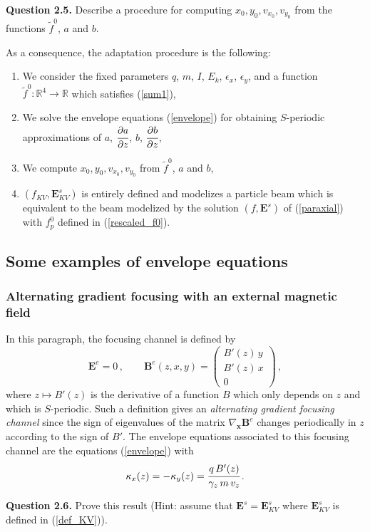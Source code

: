 \documentclass[10pt]{article}
\newcommand{\R}{{\mathbb R}}
\newcommand{\D}{{\partial}}
\begin{document}
\begin{leftbar}
\textbf{Question 2.5.} Describe a procedure for computing $x_{0},y_{0},v_{x_{0}},v_{y_{0}}$ from the functions $\tilde{f}^{0}$, $a$ and $b$.
\end{leftbar}


As a consequence, the adaptation procedure is the following:
\begin{enumerate}
\item We consider the fixed parameters $q$, $m$, $I$, $E_{k}$, $\epsilon_{x}$, $\epsilon_{y}$, and a function $\tilde{f}^{0}:\R^{4} \to \R$ which satisfies (\ref{sum1}),
\item We solve the envelope equations (\ref{envelope}) for obtaining $S$-periodic approximations of $a$, $\cfrac{\D a}{\D z}$, $b$, $\cfrac{\D b}{\D z}$,
\item We compute $x_{0},y_{0},v_{x_{0}},v_{y_{0}}$ from $\tilde{f}^{0}$, $a$ and $b$,
\item $(f_{KV},\mathbf{E}_{KV}^{s})$ is entirely defined and modelizes a particle beam which is equivalent to the beam modelized by the solution $(f,\mathbf{E}^{s})$ of (\ref{paraxial}) with $f_{p}^{0}$ defined in (\ref{rescaled_f0}).
\end{enumerate}



\subsection{Some examples of envelope equations}

\subsubsection{Alternating gradient focusing with an external magnetic field}
In this paragraph, the focusing channel is defined by
\begin{equation} \label{alternate_gradient_magnetic}
\mathbf{E}^{e} = 0 \, ,\qquad \mathbf{B}^{e}(z,x,y) = \left(
\begin{array}{c}
B'(z)\,y \\ B'(z)\,x \\ 0
\end{array}
\right) \, ,
\end{equation}
where $z \mapsto B'(z)$ is the derivative of a function $B$ which only depends on $z$ and which is $S$-periodic. Such a definition gives an \textit{alternating gradient focusing channel} since the sign of eigenvalues of the matrix $\nabla_{\mathbf{x}}\mathbf{B}^{e}$ changes periodically in $z$ according to the sign of $B'$. The envelope equations associated to this focusing channel are the equations (\ref{envelope}) with 
\begin{equation}
\kappa_{x}(z) = -\kappa_{y}(z) = \cfrac{q\,B'(z)}{\gamma_{z}\,m\,v_{z}} \, .
\end{equation}
\begin{leftbar}
\textbf{Question 2.6.\footnotemark[2]} Prove this result (Hint: assume that $\mathbf{E}^{s} = \mathbf{E}_{KV}^{s}$ where $\mathbf{E}_{KV}^{s}$ is defined in (\ref{def_KV})).
\end{leftbar}
\end{document}
